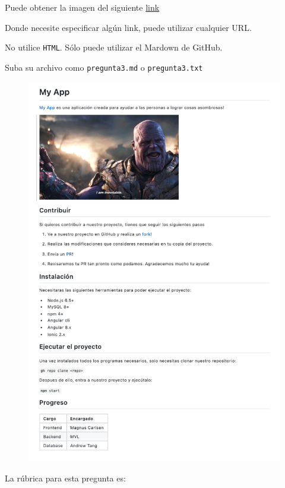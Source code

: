 \documentclass[12pt]{exam}
\begin{document}
\begin{questions}
Puede obtener la imagen del siguiente \href{https://preview.redd.it/sk9nb6lgccq31.gif?format=png8&s=4314adede1e763a54cb4b435e3d246da0460d3ae}{link}

Donde necesite especificar algún link, puede utilizar cualquier URL.

No utilice \lstinline{HTML}. Sólo puede utilizar el Mardown de GitHub.

Suba su archivo como \lstinline{pregunta3.md} o \lstinline{pregunta3.txt}

\newpage

\begin{figure}[ht!]
  \centering
  \includegraphics[width=0.9\linewidth]{../figures/pregunta3.png}
  \label{fig:p3}
\end{figure}

\newpage

La rúbrica para esta pregunta es:

\begin{table}[h]
\end{table}
\end{questions}
\end{document}
